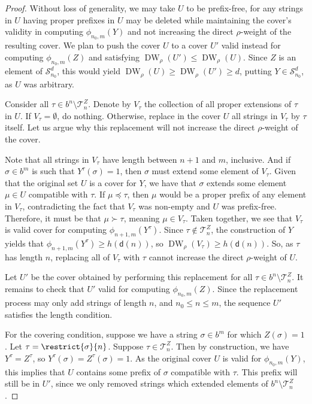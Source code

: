 \begin{proof}
    Without loss of generality, we may take $U$ to be prefix-free, for any strings in $U$ having proper prefixes in $U$ may be deleted while maintaining the cover's validity in computing $\phi_{n_0, m}(Y)$ and not increasing the direct $\rho$-weight of the resulting cover. We plan to push the cover $U$ to a cover $U'$ valid instead for computing $\phi_{n_0, m}(Z)$ and satisfying $\operatorname{DW}_\rho(U') \leq \operatorname{DW}_\rho(U)$. Since $Z$ is an element of $\mathcal{S}_{n_0}^d$, this would yield $\operatorname{DW}_\rho(U) \geq \operatorname{DW}_\rho(U') \geq d$, putting $Y \in \mathcal{S}_{n_0}^d$, as $U$ was arbitrary.
    
    Consider all $\tau \in b^n \setminus \mathcal{T}^Z_n$. Denote by $V_\tau$ the collection of all proper extensions of $\tau$ in $U$. If $V_\tau = \emptyset$, do nothing. Otherwise, replace in the cover $U$ all strings in $V_\tau$ by $\tau$ itself. Let us argue why this replacement will not increase the direct $\rho$-weight of the cover. 
    
    Note that all strings in $V_\tau$ have length between $n + 1$ and $m$, inclusive. And if $\sigma \in b^m$ is such that $Y^\tau(\sigma) = 1$, then $\sigma$ must extend some element of $V_\tau$. Given that the original set $U$ is a cover for $Y$, we have that $\sigma$ extends some element $\mu \in U$ compatible with $\tau$. If $\mu \preceq \tau$, then $\mu$ would be a proper prefix of any element in $V_\tau$, contradicting the fact that $V_\tau$ was non-empty and $U$ was prefix-free. Therefore, it must be that $\mu \succ \tau$, meaning $\mu \in V_\tau.$ Taken together, we see that $V_\tau$ is valid cover for computing $\phi_{n + 1, m}(Y^\tau)$. Since $\tau \not\in \mathcal{T}^Z_n$, the construction of $Y$ yields that $\phi_{n + 1, m}(Y^\tau) \geq h(\mathsf{d}(n))$, so $\operatorname{DW}_\rho(V_\tau) \geq h(\mathsf{d}(n)).$ So, as $\tau$ has length $n$, replacing all of $V_\tau$ with $\tau$ cannot increase the direct $\rho$-weight of $U$.
    
    Let $U'$ be the cover obtained by performing this replacement for all $\tau \in b^n \setminus \mathcal{T}^Z_n$. It remains to check that $U'$ valid for computing $\phi_{n_0, m}(Z)$. Since the replacement process may only add strings of length $n$, and $n_0 \leq n \leq m$, the sequence $U'$ satisfies the length condition. 
    
    For the covering condition, suppose we have a string $\sigma \in b^m$ for which $Z(\sigma) = 1$. Let $\tau = \restrict{\sigma}{n}$. Suppose $\tau \in \mathcal{T}^Z_n$. Then by construction, we have $Y^\tau = Z^\tau$, so $Y^\tau(\sigma) = Z^\tau(\sigma) = 1$. As the original cover $U$ is valid for $\phi_{n_0, m}(Y)$, this implies that $U$ contains some prefix of $\sigma$ compatible with $\tau$. This prefix will still be in $U'$, since we only removed strings which extended elements of $b^n \setminus \mathcal{T}^Z_n$.
    

\end{proof}
